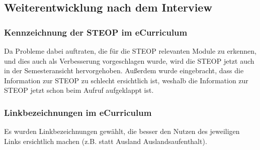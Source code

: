 \documentclass[a4paper,10pt]{scrartcl}
\begin{document}
\subsection{Weiterentwicklung nach dem Interview}

\subsubsection*{Kennzeichnung der STEOP im eCurriculum}

Da Probleme dabei auftraten, die für die STEOP relevanten Module zu erkennen, und dies auch als Verbesserung vorgeschlagen wurde, wird die STEOP jetzt auch in der
Semesteransicht hervorgehoben. Außerdem wurde eingebracht, dass die Information zur STEOP zu schlecht ersichtlich ist, weshalb die Information zur STEOP jetzt
schon beim Aufruf aufgeklappt ist.

\noindent{}
\medskip

\subsubsection*{Linkbezeichnungen im eCurriculum}

Es wurden Linkbezeichnungen gewählt, die besser den Nutzen des jeweiligen Links ersichtlich machen (z.B. statt Ausland Auslandsaufenthalt).

\noindent{}
\medskip
\end{document}
